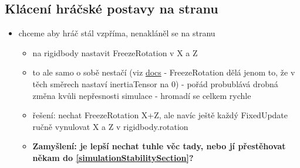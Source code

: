 \subsection{Klácení hráčské postavy na stranu} \label{playerFallingToSideSection}
\begin{itemize}
  \item chceme aby hráč stál vzpříma, nenakláněl se na stranu
        \begin{itemize}
          \item na rigidbody nastavit FreezeRotation v X a Z
          \item to ale samo o sobě nestačí (viz \href{https://docs.unity3d.com/ScriptReference/Rigidbody-constraints.html}{docs} - FreezeRotation dělá jenom to, že v těch směrech nastaví inertiaTensor na 0) - pořád probublává drobná změna kvůli nepřesnosti simulace - hromadí se celkem rychle
          \item řešení: nechat FreezeRotation X+Z, ale navíc ještě každý FixedUpdate ručně vynulovat X a Z v rigidbody.rotation
          \item \textbf{Zamyšlení: je lepší nechat tuhle věc tady, nebo jí přestěhovat někam do \ref{simulationStabilitySection}?}
        \end{itemize}
\end{itemize}

